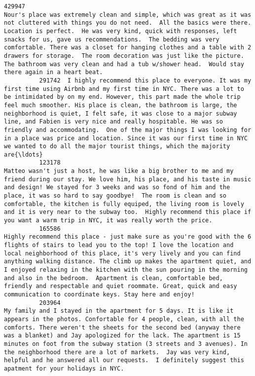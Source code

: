 \documentclass[11pt]{article}
\begin{document}
\begin{Verbatim}[commandchars=\\\{\}]
          429947                                                                                            Nour's place was extremely clean and simple, which was great as it was not cluttered with things you do not need.  All the basics were there.  Location is perfect.  He was very kind, quick with responses, left snacks for us, gave us recommendations.  The bedding was very comfortable. There was a closet for hanging clothes and a table with 2 drawers for storage.  The room decoration was just like the picture. The bathroom was very clean and had a tub w/shower head.  Would stay there again in a heart beat.   
          291742  I highly recommend this place to everyone. It was my first time using Airbnb and my first time in NYC. There was a lot to be intimidated by on my end. However, this part made the whole trip feel much smoother. His place is clean, the bathroom is large, the neighborhood is quiet, I felt safe, it was close to a major subway line, and Fabien is very nice and really hospitable. He was so friendly and accommodating.  One of the major things I was looking for in a place was price and location. Since it was our first time in NYC we wanted to do all the major tourist things, which the majority are{\ldots}   
          123178                                                                                                                                        Matteo wasn't just a host, he was like a big brother to me and my friend during our stay. We love him, his place, and his taste in music and design! We stayed for 3 weeks and was so fond of him and the place, it was so hard to say goodbye!  The room is clean and so comfortable, the kitchen is fully equiped, the living room is lovely and it is very near to the subway too.  Highly recommend this place if you want a warm trip in NYC, it was really worth the price.   
          165586                                                                       Highly recommend this place - just make sure as you're good with the 6 flights of stairs to lead you to the top! I love the location and local neighborhood of this place, it's very lively and you can find anything walking distance. The climb up makes the apartment quiet, and I enjoyed relaxing in the kitchen with the sun pouring in the morning and also in the bedroom.  Apartment is clean, comfortable bed, friendly and respectable and quiet roommate. Great, quick and easy communication to coordinate keys. Stay here and enjoy!   
          203964                                                                                            My family and I stayed in the apartment for 5 days. It is like it appears in the photos. Confortable for 4 people, clean, with all the comforts. There weren't the sheets for the second bed (anyway there was a blanket) and Jay apologized for the lack. The apartment is 15 minutes on foot from the subway station (3 streets and 3 avenues). In the neighborhood there are a lot of markets.  Jay was very kind, helpful and he answered all our requests.  I definitely suggest this apatment for your holidays in NYC.   

\end{Verbatim}
\end{document}
